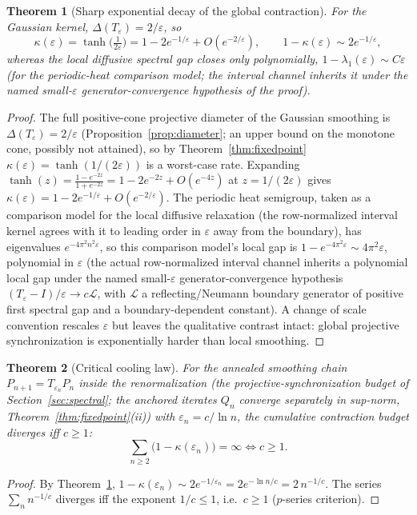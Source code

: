 \documentclass[11pt]{article}
\theoremstyle{plain}
\newtheorem{theorem}{Theorem}[section]
\theoremstyle{definition}
\theoremstyle{remark}
\begin{document}
\begin{theorem}[Sharp exponential decay of the global contraction]\label{thm:sharpdecay}
For the Gaussian kernel, $\Delta(T_\varepsilon)=2/\varepsilon$, so
\[
\kappa(\varepsilon)=\tanh\!\Big(\tfrac{1}{2\varepsilon}\Big)=1-2e^{-1/\varepsilon}+O(e^{-2/\varepsilon}),
\qquad 1-\kappa(\varepsilon)\sim 2e^{-1/\varepsilon},
\]
whereas the local diffusive spectral gap closes only polynomially, $1-\lambda_1(\varepsilon)\sim C\varepsilon$ (for the periodic-heat comparison model; the interval channel inherits it under the named small-$\varepsilon$ generator-convergence hypothesis of the proof).
\end{theorem}
\begin{proof}
The full positive-cone projective diameter of the Gaussian smoothing is $\Delta(T_\varepsilon)=2/\varepsilon$ (Proposition~\ref{prop:diameter}; an upper bound on the monotone cone, possibly not attained), so by Theorem~\ref{thm:fixedpoint} $\kappa(\varepsilon)=\tanh(1/(2\varepsilon))$ is a worst-case rate. Expanding $\tanh(z)=\frac{1-e^{-2z}}{1+e^{-2z}}=1-2e^{-2z}+O(e^{-4z})$ at $z=1/(2\varepsilon)$ gives $\kappa(\varepsilon)=1-2e^{-1/\varepsilon}+O(e^{-2/\varepsilon})$. The periodic heat semigroup, taken as a comparison model for the local diffusive relaxation (the row-normalized interval kernel agrees with it to leading order in $\varepsilon$ away from the boundary), has eigenvalues $e^{-4\pi^2 n^2\varepsilon}$, so this comparison model's local gap is $1-e^{-4\pi^2\varepsilon}\sim 4\pi^2\varepsilon$, polynomial in $\varepsilon$ (the actual row-normalized interval channel inherits a polynomial local gap under the named small-$\varepsilon$ generator-convergence hypothesis $(T_\varepsilon-I)/\varepsilon\to c\mathcal L$, with $\mathcal L$ a reflecting/Neumann boundary generator of positive first spectral gap and a boundary-dependent constant). A change of scale convention rescales $\varepsilon$ but leaves the qualitative contrast intact: global projective synchronization is exponentially harder than local smoothing.
\end{proof}

\begin{theorem}[Critical cooling law]\label{thm:cooling}
For the annealed smoothing chain $P_{n+1}=T_{\varepsilon_n}P_n$ inside the renormalization (the projective-synchronization budget of Section~\ref{sec:spectral}; the anchored iterates $Q_n$ converge separately in sup-norm, Theorem~\ref{thm:fixedpoint}(ii)) with $\varepsilon_n=c/\ln n$, the cumulative contraction budget diverges iff $c\ge1$:
\[
\sum_{n\ge2}\big(1-\kappa(\varepsilon_n)\big)=\infty \iff c\ge1 .
\]
\end{theorem}
\begin{proof}
By Theorem~\ref{thm:sharpdecay}, $1-\kappa(\varepsilon_n)\sim 2e^{-1/\varepsilon_n}=2e^{-\ln n/c}=2\,n^{-1/c}$. The series $\sum_n n^{-1/c}$ diverges iff the exponent $1/c\le1$, i.e.\ $c\ge1$ ($p$-series criterion).
\end{proof}
\end{document}
